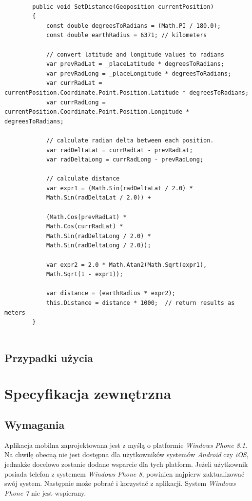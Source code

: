 \documentclass[a4paper]{book}
\begin{document}
		\begin{lstlisting}[label={lst:haversin},caption=Funkcja obliczająca dystans pomiędzy pozycją użytkownika a punktem na mapie]
		
		public void SetDistance(Geoposition currentPosition)
		{
			const double degreesToRadians = (Math.PI / 180.0);
			const double earthRadius = 6371; // kilometers
			
			// convert latitude and longitude values to radians
			var prevRadLat = _placeLatitude * degreesToRadians;
			var prevRadLong = _placeLongitude * degreesToRadians;
			var currRadLat = currentPosition.Coordinate.Point.Position.Latitude * degreesToRadians;
			var currRadLong = currentPosition.Coordinate.Point.Position.Longitude * degreesToRadians;
			
			// calculate radian delta between each position.
			var radDeltaLat = currRadLat - prevRadLat;
			var radDeltaLong = currRadLong - prevRadLong;
			
			// calculate distance
			var expr1 = (Math.Sin(radDeltaLat / 2.0) *
			Math.Sin(radDeltaLat / 2.0)) +
			
			(Math.Cos(prevRadLat) *
			Math.Cos(currRadLat) *
			Math.Sin(radDeltaLong / 2.0) *
			Math.Sin(radDeltaLong / 2.0));
			
			var expr2 = 2.0 * Math.Atan2(Math.Sqrt(expr1),
			Math.Sqrt(1 - expr1));
			
			var distance = (earthRadius * expr2);
			this.Distance = distance * 1000;  // return results as meters
		}
		
		\end{lstlisting}


		\section{Przypadki użycia}
		
		
	\chapter{Specyfikacja zewnętrzna}
	\label{id:cha:specyfikacja_zewnetrzna}
		\section{Wymagania}
		
		Aplikacja mobilna zaprojektowana jest z myślą o platformie \emph{Windows Phone 8.1}. Na chwilę obecną nie jest dostępna dla użytkowników systemów \emph{Android} czy \emph{iOS}, jednakże docelowo zostanie dodane wsparcie dla tych platform. Jeżeli użytkownik posiada telefon z systemem \emph{Windows Phone 8}, powinien najpierw zaktualizować swój system. Następnie może pobrać i korzystać z aplikacji. System \emph{Windows Phone 7} nie jest wspierany.
		
\end{document}
